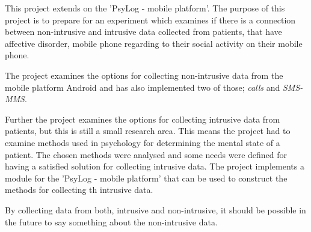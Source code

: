 This project extends on the 'PsyLog - mobile platform'\cite{faelles}.
The purpose of this project is to prepare for an experiment which examines if there is a connection between non-intrusive and intrusive data collected from patients, that have affective disorder, mobile phone regarding to their social activity on their mobile phone.

The project examines the options for collecting non-intrusive data from the mobile platform Android and has also implemented two of those; \textit{calls} and \textit{SMS-MMS}.

Further the project examines the options for collecting intrusive data from patients, but this is still a small research area.
This means the project had to examine methods used in psychology for determining the mental state of a patient.
The chosen methods were analysed and some needs were defined for having a satisfied solution for collecting intrusive data.
The project implements a module for the 'PsyLog - mobile platform' that can be used to construct the methods for collecting th intrusive data.

By collecting data from both, intrusive and non-intrusive, it should be possible in the future to say something about the non-intrusive data.
